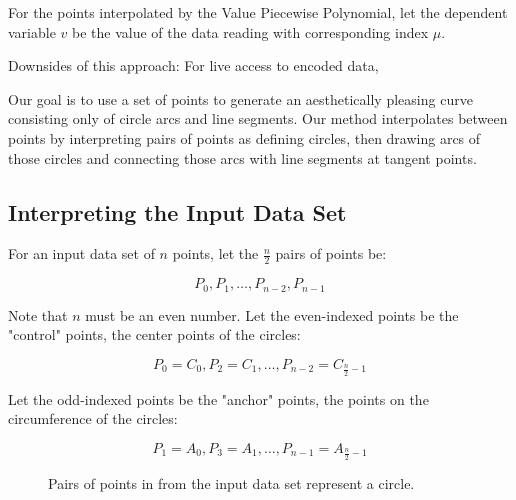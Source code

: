 \documentclass{article}
\begin{document}
For the points interpolated by the Value Piecewise Polynomial, let the dependent variable \(v\) be the value of the data reading with corresponding index $\mu$.

Downsides of this approach:
For live access to encoded data, 




Our goal is to use a set of points to generate an aesthetically pleasing curve consisting only of circle arcs and line segments. Our method interpolates between points by interpreting pairs of points as defining circles, then drawing arcs of those circles and connecting those arcs with line segments at tangent points.

\newpage
\newpage
\mbox{} %


\subsection{Interpreting the Input Data Set}
For an input data set of \( n \) points, let the \( \frac{n}{2} \) pairs of points be:

\[ P_0, P_1, \ldots, P_{n-2}, P_{n-1} \]

Note that \( n \) must be an even number. Let the even-indexed points be the "control" points, the center points of the circles:

\[ P_0 = C_0, P_2 = C_1, \ldots, P_{n-2} = C_{\frac{n}{2}-1} \]

Let the odd-indexed points be the "anchor" points, the points on the circumference of the circles:

\[ P_1 = A_0, P_3 = A_1, \ldots, P_{n-1} = A_{\frac{n}{2}-1} \]


\begin{figure}[!h]
\centering
{}
\caption{Pairs of points in from the input data set represent a circle.}
\label{fig:pairs_of_points_define_a_circle}
\end{figure}
\end{document}
